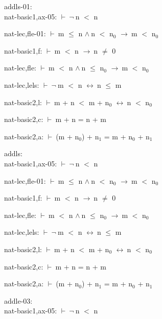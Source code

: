 \documentclass[a4paper]{article}
\newcommand{\Fol}{\mbox{$\vdash\ $}}
\newcommand{\Not}{\mbox{$\neg\ $}}
\newcommand{\And}{\mbox{$\wedge\ $}}
\newcommand{\Imp}{\mbox{$\rightarrow\ $}}
\newcommand{\Equiv}{\mbox{$\leftrightarrow\ $}}
\begin{document}
addls-01:\\ nat-basic1,ax-05: 
 \Fol \Not n $<$ n



nat-lec,fle-01: 
 \Fol m $\le$ n \And n $<$ $\mbox{n}_{0}$ \Imp m $<$ $\mbox{n}_{0}$



nat-basic1,f: 
 \Fol m $<$ n \Imp n $\neq$ 0



nat-lec,fle: 
 \Fol m $<$ n \And n $\le$ $\mbox{n}_{0}$ \Imp m $<$ $\mbox{n}_{0}$



nat-lec,lels: 
 \Fol \Not m $<$ n \Equiv n $\le$ m



nat-basic2,l: 
 \Fol m + n $<$ m + $\mbox{n}_{0}$ \Equiv n $<$ $\mbox{n}_{0}$



nat-basic2,c: 
 \Fol m + n = n + m



nat-basic2,a: 
 \Fol (m + $\mbox{n}_{0}$) + $\mbox{n}_{1}$ = m + $\mbox{n}_{0}$ + $\mbox{n}_{1}$



\bigskip

addls:\\ nat-basic1,ax-05: 
 \Fol \Not n $<$ n



nat-lec,fle-01: 
 \Fol m $\le$ n \And n $<$ $\mbox{n}_{0}$ \Imp m $<$ $\mbox{n}_{0}$



nat-basic1,f: 
 \Fol m $<$ n \Imp n $\neq$ 0



nat-lec,fle: 
 \Fol m $<$ n \And n $\le$ $\mbox{n}_{0}$ \Imp m $<$ $\mbox{n}_{0}$



nat-lec,lels: 
 \Fol \Not m $<$ n \Equiv n $\le$ m



nat-basic2,l: 
 \Fol m + n $<$ m + $\mbox{n}_{0}$ \Equiv n $<$ $\mbox{n}_{0}$



nat-basic2,c: 
 \Fol m + n = n + m



nat-basic2,a: 
 \Fol (m + $\mbox{n}_{0}$) + $\mbox{n}_{1}$ = m + $\mbox{n}_{0}$ + $\mbox{n}_{1}$



\bigskip

addle-03:\\ nat-basic1,ax-05: 
 \Fol \Not n $<$ n
\end{document}
